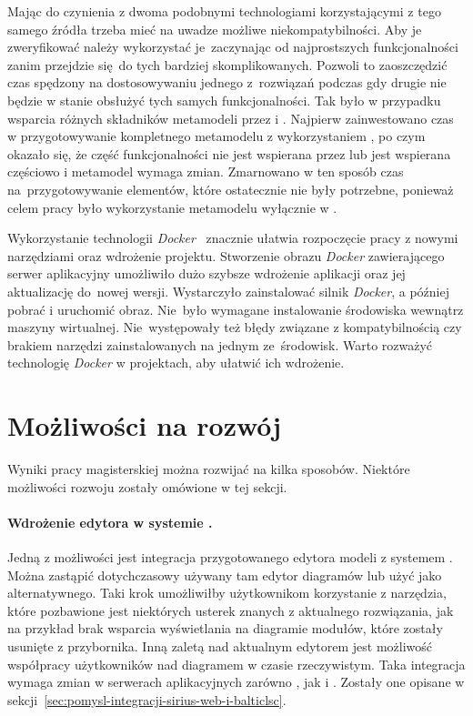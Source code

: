 Mając do czynienia z dwoma podobnymi technologiami korzystającymi z tego samego
źródła trzeba mieć na uwadze możliwe niekompatybilności. Aby je zweryfikować
należy wykorzystać je~zaczynając od najprostszych funkcjonalności zanim
przejdzie się do tych
bardziej skomplikowanych. Pozwoli to zaoszczędzić czas spędzony na
dostosowywaniu jednego z~rozwiązań podczas gdy drugie nie będzie w stanie
obsłużyć tych samych funkcjonalności. Tak było w przypadku wsparcia różnych
składników metamodeli \EMF{} przez \SiriusDesktop{} i \SiriusWeb{}. Najpierw
zainwestowano czas w przygotowywanie kompletnego
metamodelu z
wykorzystaniem \SiriusDesktop{}, po czym okazało się, że część
funkcjonalności nie jest wspierana przez \SiriusWeb{} lub jest wspierana
częściowo i metamodel wymaga zmian. Zmarnowano w ten sposób czas
na~przygotowywanie elementów, które ostatecznie nie były potrzebne, ponieważ
celem
pracy było wykorzystanie metamodelu wyłącznie w \SiriusWeb{}.

Wykorzystanie technologii \emph{Docker}~\cite{wikipedia-docker} znacznie
ułatwia rozpoczęcie pracy z
nowymi narzędziami oraz wdrożenie projektu.
Stworzenie obrazu \emph{Docker} zawierającego serwer aplikacyjny \SiriusWeb{}
umożliwiło dużo szybsze wdrożenie aplikacji oraz jej aktualizację
do~nowej wersji. Wystarczyło zainstalować silnik \emph{Docker}, a później
pobrać i uruchomić obraz. Nie~było wymagane instalowanie środowiska \Java{}
wewnątrz maszyny wirtualnej. Nie~występowały też błędy związane z
kompatybilnością czy brakiem narzędzi zainstalowanych na jednym ze~środowisk.
Warto rozważyć technologię \emph{Docker} w projektach, aby ułatwić ich
wdrożenie.

\section{Możliwości na rozwój}

Wyniki pracy magisterskiej można rozwijać na kilka sposobów. Niektóre
możliwości rozwoju zostały omówione w tej sekcji.

\paragraph{Wdrożenie edytora w systemie \BalticLSC{}.}
Jedną z możliwości jest integracja przygotowanego edytora modeli z systemem
\BalticLSC{}. Można zastąpić dotychczasowy używany tam edytor diagramów lub
użyć \SiriusWeb{} jako alternatywnego. Taki krok umożliwiłby użytkownikom
\BalticLSC{} korzystanie z narzędzia, które pozbawione jest niektórych
usterek znanych z aktualnego rozwiązania, jak na przykład brak wsparcia
wyświetlania na diagramie modułów, które zostały usunięte z przybornika.
Inną zaletą \SiriusWeb{} nad aktualnym edytorem jest możliwość współpracy
użytkowników nad diagramem w czasie rzeczywistym. Taka integracja wymaga zmian
w serwerach aplikacyjnych zarówno \SiriusWeb{}, jak i \BalticLSC{}.
Zostały one opisane w
sekcji~\ref{sec:pomysl-integracji-sirius-web-i-balticlsc}.

